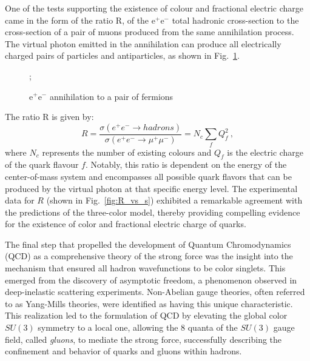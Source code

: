 One of the tests supporting the existence of colour and fractional electric charge came in the form of the ratio R, of the $\mathrm{e}^+ \mathrm{e}^-$ total hadronic cross-section to the cross-section of a pair of muons produced from the same annihilation process. The virtual photon emitted in the annihilation can produce all electrically charged pairs of particles and antiparticles, as shown in Fig.~\ref{fig:ee_to_ff_diagram}.
\begin{figure}[h]
    \centering
        ;
\caption{$\mathrm{e}^+ \mathrm{e}^-$ annihilation to a pair of fermions}
    \label{fig:ee_to_ff_diagram}
\end{figure}

The ratio R is given by:
\begin{equation*}
    R = \frac{\sigma(e^+e^- \rightarrow hadrons)}{\sigma(e^+e^- \rightarrow \mu^+\mu^-)} = N_c \sum_f Q_f^2\ ,
\end{equation*}
where $N_c$ represents the number of existing colours and $Q_f$ is the electric charge of the quark flavour $f$. Notably, this ratio is dependent on the energy of the center-of-mass system and encompasses all possible quark flavors that can be produced by the virtual photon at that specific energy level. The experimental data for $R$ (shown in Fig.~\ref{fig:R_vs_s}) exhibited a remarkable agreement with the predictions of the three-color model, thereby providing compelling evidence for the existence of color and fractional electric charge of quarks.

The final step that propelled the development of Quantum Chromodynamics (QCD) as a comprehensive theory of the strong force was the insight into the mechanism that ensured all hadron wavefunctions to be color singlets. This emerged from the discovery of asymptotic freedom, a phenomenon observed in deep-inelastic scattering experiments. Non-Abelian gauge theories, often referred to as Yang-Mills theories, were identified as having this unique characteristic. This realization led to the formulation of QCD by elevating the global color $SU(3)$ symmetry to a local one, allowing the 8 quanta of the $SU(3)$ gauge field, called \emph{gluons}, to mediate the strong force, successfully describing the confinement and behavior of quarks and gluons within hadrons.


